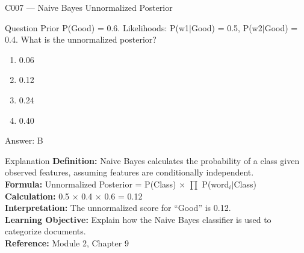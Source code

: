 \documentclass[aspectratio=169,8pt]{beamer}
\begin{document}
	\begin{frame}{C007 --- Naive Bayes Unnormalized Posterior}
		\begin{block}{Question}
			Prior P(Good) = 0.6. Likelihoods: P(w1$|$Good) = 0.5, P(w2$|$Good) = 0.4. What is the unnormalized posterior?
			\begin{enumerate}
				\item 0.06
				\item 0.12
				\item 0.24
				\item 0.40
			\end{enumerate}
		\end{block}
		\begin{exampleblock}{Answer: B}\end{exampleblock}
		\begin{block}{Explanation}
			\textbf{Definition:} Naive Bayes calculates the probability of a class given observed features, assuming features are conditionally independent.\\
			\textbf{Formula:} Unnormalized Posterior = P(Class) $\times$ $\prod$ P(word$_{i}$$|$Class)\\
			\textbf{Calculation:} 0.5 $\times$ 0.4 $\times$ 0.6 = 0.12\\
			\textbf{Interpretation:} The unnormalized score for ``Good'' is 0.12.\\
			\textbf{Learning Objective:} Explain how the Naive Bayes classifier is used to categorize documents.\\
			\textbf{Reference:} Module 2, Chapter 9
		\end{block}
	\end{frame}
	
\end{document}
